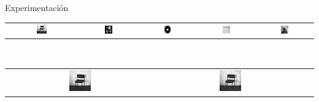 \documentclass{beamer}
\theoremstyle{plain} %
\theoremstyle{definition}
\begin{document}
\begin{frame}[squeeze]{Experimentación}
  \begin{table}
  \centering
    \begin{tabular}{ccccc}\hline
    \includegraphics[width=0.15\textwidth]{img/orig/chair.jpg} &
    \includegraphics[width=0.15\textwidth]{img/orig/block.jpg} &
    \includegraphics[width=0.15\textwidth]{img/orig/02.jpg} &
    \includegraphics[width=0.15\textwidth]{img/orig/09.jpg} &
    \includegraphics[width=0.15\textwidth]{img/orig/07.jpg}\\
    \end{tabular}\\
    \begin{tabular}{ccc}
    \includegraphics[width=0.15\textwidth]{img/orig/chairga.jpg} &
    \includegraphics[width=0.15\textwidth]{img/orig/chairsp005.jpg} &

\end{tabular}
\end{table}
\end{frame}
\end{document}
